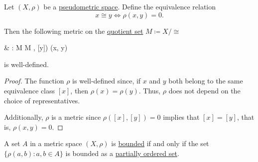 \begin{proposition}\label{thm:pseudometric_to_metric}
  Let \( (X, \rho) \) be a \hyperref[def:metric_space]{pseudometric space}. Define the equivalence relation
  \begin{equation*}
    x \cong y \iff \rho(x, y) = 0.
  \end{equation*}

  Then the following metric on the \hyperref[thm:equivalence_partition]{quotient set} \( M \coloneqq X / \cong \)
  \begin{balign*}
     & \rho: M \times M \to [0, \infty)    \\
     & \rho([x], [y]) \coloneqq \rho(x, y)
  \end{balign*}
  is well-defined.
\end{proposition}
\begin{proof}
  The function \( \rho \) is well-defined since, if \( x \) and \( y \) both belong to the same equivalence class \( [x] \), then \( \rho(x) = \rho(y) \). Thus, \( \rho \) does not depend on the choice of representatives.

  Additionally, \( \rho \) is a metric since \( \rho([x], [y]) = 0 \) implies that \( [x] = [y] \), that is, \( \rho(x, y) = 0 \).
\end{proof}

\begin{proposition}\label{rem:bounded_set_metric_order_equivalence}
  A set \( A \) in a metric space \( (X, \rho) \) is \hyperref[def:metric_space/bounded_set]{bounded} if and only if the set \( \{ \rho(a, b) \colon a, b \in A \} \) is bounded as a \hyperref[def:partially_ordered_set_extremal_points/upper_and_lower_bounds]{partially ordered set}.
\end{proposition}

